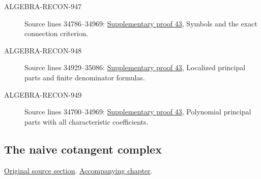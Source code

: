\begin{description}
\item[ALGEBRA-RECON-947] Source lines 34786--34969: \hyperlink{algebra_diff_operators_notes_20260928}{Supplementary proof 43}, Symbols and the exact connection criterion.
\item[ALGEBRA-RECON-948] Source lines 34929--35086: \hyperlink{algebra_diff_operators_notes_20260928}{Supplementary proof 43}, Localized principal parts and finite denominator formulas.
\item[ALGEBRA-RECON-949] Source lines 34700--34969: \hyperlink{algebra_diff_operators_notes_20260928}{Supplementary proof 43}, Polynomial principal parts with all characteristic coefficients.
\end{description}

\subsection{The naive cotangent complex}
\hypertarget{algebra-source-section-netherlander}{}
\noindent\href{https://github.com/stacks/stacks-project/blob/a04446e57ec1fbc252a871afcec7752fb2807b14/algebra.tex\#L35116}{Original source section}. \href{algebra.pdf\#nameddest=section-netherlander}{Accompanying chapter}.

